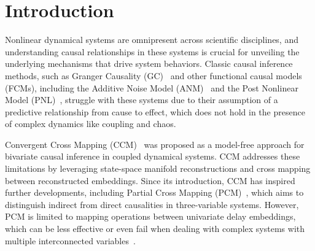 \section{Introduction}

Nonlinear dynamical systems are omnipresent across scientific disciplines, and understanding causal relationships in these systems is crucial for unveiling the underlying mechanisms that drive system behaviors. Classic causal inference methods, such as Granger Causality (GC)~\citep{granger1969investigating} and other functional causal models (FCMs), including the Additive Noise Model (ANM)~\citep{hoyer2008nonlinear, liu2024causal} and the Post Nonlinear Model (PNL)~\citep{zhang2015estimation, keropyan2023rank}, struggle with these systems due to their assumption of a predictive relationship from cause to effect, which does not hold in the presence of complex dynamics like coupling and chaos.


Convergent Cross Mapping (CCM)~\citep{sugihara2012detecting, barraquand2021inferring} was proposed as a model-free approach for bivariate causal inference in coupled dynamical systems. CCM addresses these limitations by leveraging state-space manifold reconstructions and cross mapping between reconstructed embeddings. Since its introduction, CCM has inspired further developments, including Partial Cross Mapping (PCM)~\citep{leng2020partial}, which aims to distinguish indirect from direct causalities in three-variable systems. However, PCM is limited to mapping operations between univariate delay embeddings, which can be less effective or even fail when dealing with complex systems with multiple interconnected variables~\citep{chen2022causation}.

